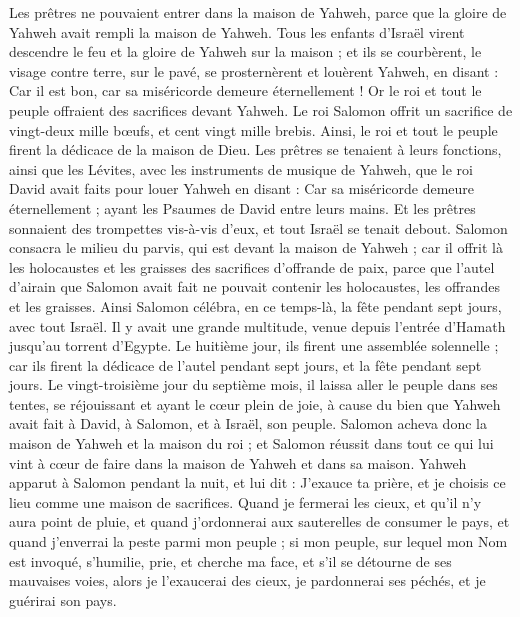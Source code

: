\begin{multicols}{2}
Les prêtres ne pouvaient entrer dans la maison de Yahweh, parce que la gloire de Yahweh avait rempli la maison de Yahweh.
Tous les enfants d'Israël virent descendre le feu et la gloire de Yahweh sur la maison ; et ils se courbèrent, le visage contre terre, sur le pavé, se prosternèrent et louèrent Yahweh, en disant : Car il est bon, car sa miséricorde demeure éternellement !
Or le roi et tout le peuple offraient des sacrifices devant Yahweh.
Le roi Salomon offrit un sacrifice de vingt-deux mille bœufs, et cent vingt mille brebis. Ainsi, le roi et tout le peuple firent la dédicace de la maison de Dieu.
Les prêtres se tenaient à leurs fonctions, ainsi que les Lévites, avec les instruments de musique de Yahweh, que le roi David avait faits pour louer Yahweh en disant : Car sa miséricorde demeure éternellement ; ayant les Psaumes de David entre leurs mains. Et les prêtres sonnaient des trompettes vis-à-vis d'eux, et tout Israël se tenait debout.
Salomon consacra le milieu du parvis, qui est devant la maison de Yahweh ; car il offrit là les holocaustes et les graisses des sacrifices d'offrande de paix, parce que l'autel d'airain que Salomon avait fait ne pouvait contenir les holocaustes, les offrandes et les graisses.
Ainsi Salomon célébra, en ce temps-là, la fête pendant sept jours, avec tout Israël. Il y avait une grande multitude, venue depuis l'entrée d'Hamath jusqu'au torrent d'Egypte.
Le huitième jour, ils firent une assemblée solennelle ; car ils firent la dédicace de l'autel pendant sept jours, et la fête pendant sept jours.
Le vingt-troisième jour du septième mois, il laissa aller le peuple dans ses tentes, se réjouissant et ayant le cœur plein de joie, à cause du bien que Yahweh avait fait à David, à Salomon, et à Israël, son peuple.
Salomon acheva donc la maison de Yahweh et la maison du roi ; et Salomon réussit dans tout ce qui lui vint à cœur de faire dans la maison de Yahweh et dans sa maison.
Yahweh apparut à Salomon pendant la nuit, et lui dit : J'exauce ta prière, et je choisis ce lieu comme une maison de sacrifices.
Quand je fermerai les cieux, et qu'il n'y aura point de pluie, et quand j'ordonnerai aux sauterelles de consumer le pays, et quand j'enverrai la peste parmi mon peuple ;
si mon peuple, sur lequel mon Nom est invoqué, s'humilie, prie, et cherche ma face, et s'il se détourne de ses mauvaises voies, alors je l'exaucerai des cieux, je pardonnerai ses péchés, et je guérirai son pays.

\end{multicols}
